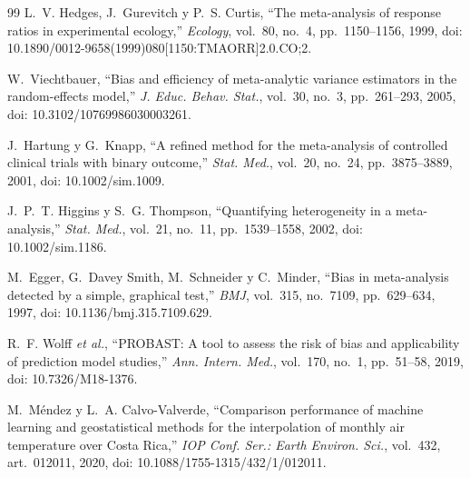 \documentclass[conference]{IEEEtran}
\begin{document}
\begin{thebibliography}{99}
L.~V. Hedges, J.~Gurevitch y P.~S. Curtis, ``The meta-analysis of response ratios in experimental ecology,'' \textit{Ecology}, vol.~80, no.~4, pp.~1150--1156, 1999, doi: 10.1890/0012-9658(1999)080[1150:TMAORR]2.0.CO;2.

W.~Viechtbauer, ``Bias and efficiency of meta-analytic variance estimators in the random-effects model,'' \textit{J. Educ. Behav. Stat.}, vol.~30, no.~3, pp.~261--293, 2005, doi: 10.3102/10769986030003261.

J.~Hartung y G.~Knapp, ``A refined method for the meta-analysis of controlled clinical trials with binary outcome,'' \textit{Stat. Med.}, vol.~20, no.~24, pp.~3875--3889, 2001, doi: 10.1002/sim.1009.

J.~P.~T. Higgins y S.~G. Thompson, ``Quantifying heterogeneity in a meta-analysis,'' \textit{Stat. Med.}, vol.~21, no.~11, pp.~1539--1558, 2002, doi: 10.1002/sim.1186.

M.~Egger, G.~Davey Smith, M.~Schneider y C.~Minder, ``Bias in meta-analysis detected by a simple, graphical test,'' \textit{BMJ}, vol.~315, no.~7109, pp.~629--634, 1997, doi: 10.1136/bmj.315.7109.629.

R.~F. Wolff \textit{et al.}, ``PROBAST: A tool to assess the risk of bias and applicability of prediction model studies,'' \textit{Ann. Intern. Med.}, vol.~170, no.~1, pp.~51--58, 2019, doi: 10.7326/M18-1376.

M.~Méndez y L.~A. Calvo-Valverde, ``Comparison performance of machine learning and geostatistical methods for the interpolation of monthly air temperature over Costa Rica,'' \textit{IOP Conf. Ser.: Earth Environ. Sci.}, vol.~432, art.~012011, 2020, doi: 10.1088/1755-1315/432/1/012011.

\end{thebibliography}
\end{document}
